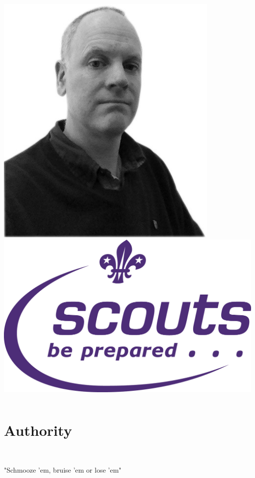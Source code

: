 \documentclass[14pt]{beamer}
\begin{document}
\begin{frame}{}
\begin{columns}
          \includegraphics[scale=0.17]{images/owencampbell}
        \pause
          \includegraphics[scale=0.25]{images/scouts}
      \end{columns}
    \end{frame}


  \section{Authority}
    \blankscreen

    \begin{frame}{}
      \begin{Huge}
        \faHeart \hfill
        \pause
        \faHandGrabO \hfill
        \pause
        \faSignOut
        \pause
      \end{Huge}\\
      \vfill
      \begin{center}\large "Schmooze 'em, bruise 'em or lose 'em"\end{center}
    \end{frame}
\end{document}
